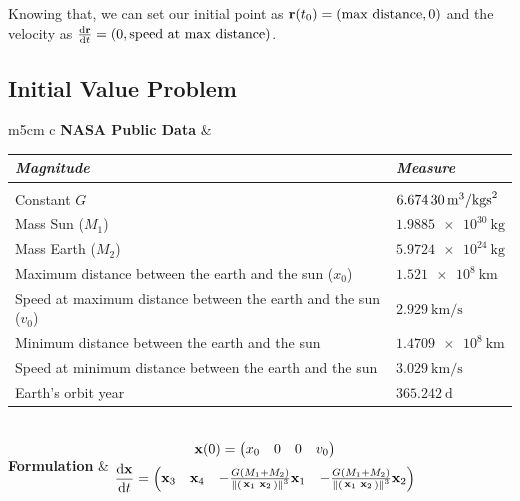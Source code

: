\documentclass[12pt, onside]{article}
\newcommand{\vr}{{\vb{r}}}
\newcommand{\vx}{{\vb{x}}}
\begin{document}
    Knowing that, we can set our initial point as
$\vr(t_0) = (\operatorname{max\ distance}, 0)$
and the velocity as
$\dv{\vr}{t}(t_0) = (0, \operatorname{speed\ at\ max\ distance})$.

\subsection{Initial Value Problem}

\begin{center}
    \begin{tabular}{m{5cm} c}
        \textbf{NASA Public Data} &
        \begin{tabular}{p{5.5cm} | m{3cm}}
            \textit{Magnitude} & \textit{Measure} \\
            \hline \hline \\
            Constant $G$ & $\SI[per-mode=fraction]{6.67430}{\meter^3\per{\kg\second^2}}$ \\
            Mass Sun ($M_1$) & $\SI{1.9885e30}{\kg}$ \\
            Mass Earth ($M_2$) & $\SI{5.9724e24}{\kg}$ \\
            Maximum distance between the earth and the sun ($x_0$) & $\SI{1.521e8}{\km}$ \\
            Speed at maximum distance between the earth and the sun ($v_0$) &
                $\SI[per-mode=fraction]{2.929}{\km\per\second}$ \\
            Minimum distance between the earth and the sun & $\SI{1.4709e8}{\km}$ \\
            Speed at minimum distance between the earth and the sun &
                $\SI[per-mode=fraction]{3.029}{\km\per\second}$ \\
            Earth's orbit year & $\SI{365.242}{\day}$ \\
        \end{tabular}
        \vspace{1cm} \\

        \textbf{Formulation} &
        $
        \begin{gathered}
            \vx(0) = \mqty(x_0 & 0 & 0 & v_0) \\
            \dv{\vx}{t} = \mqty(
                \vx_3 &
                \vx_4 &
                -\frac{G(M_1+M_2)}{\norm{\smqty(\vx_1 & \vx_2)}^3}\vx_1 &
                -\frac{G(M_1+M_2)}{\norm{\smqty(\vx_1 & \vx_2)}^3}\vx_2
            )
        \end{gathered}
        $
    \end{tabular}
\end{center}
\end{document}
